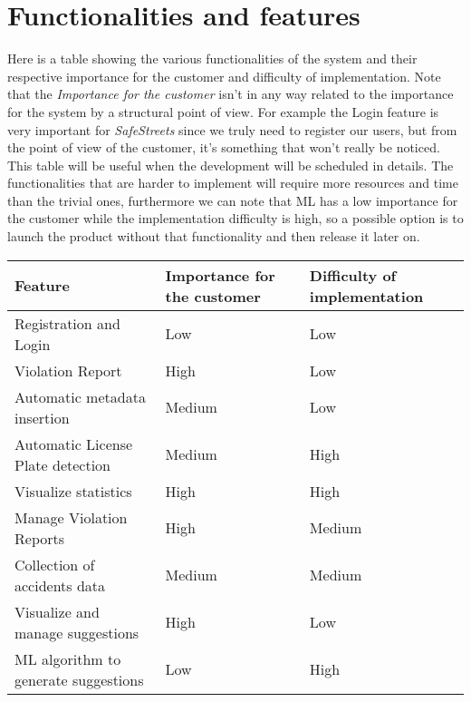 \section{Functionalities and features}
Here is a table showing the various functionalities of the system and their
respective importance for the customer and difficulty of implementation. Note
that the \emph{Importance for the customer} isn't in any way related to the
importance for the system by a structural point of view. For example the Login
feature is very important for \emph{SafeStreets} since we truly need to register
our users, but from the point of view of the customer, it's something that won't
really be noticed. This table will be useful when the development will be
scheduled in details. The functionalities that are harder to implement will
require more resources and time than the trivial ones, furthermore we can note
that ML has a low importance for the customer while the implementation
difficulty is high, so a possible option is to launch the product without that
functionality and then release it later on.

\begin{table}[ht]
    \sffamily
    \begin{tabu} to \linewidth {X[2,l,m] X[1,c,m] X[1,c,m]}
    \toprule
    \rowfont{\bfseries}
    Feature & Importance for the customer & Difficulty of implementation \\
    \midrule
    Registration and Login & Low & Low \\ 
    Violation Report & High & Low \\ 
    Automatic metadata insertion & Medium & Low \\ 
    Automatic License Plate detection & Medium & High \\ 
    Visualize statistics & High & High \\ 
    Manage Violation Reports & High & Medium \\ 
    Collection of accidents data & Medium & Medium \\ 
    Visualize and manage suggestions & High & Low \\ 
    ML algorithm to generate suggestions & Low & High \\
    \bottomrule
    \end{tabu}
\end{table}

